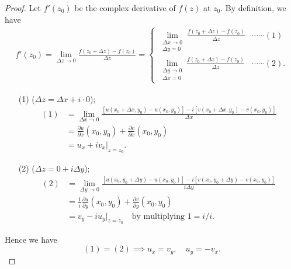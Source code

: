 \documentclass[12pt,openany]{book}
\theoremstyle{definition}
\newcommand{\of}[1]{\left( #1 \right)}
\begin{document}
	\begin{proof}
		Let $f'(z_0)$ be the complex derivative of $f(z)$ at $z_0$. By definition, we have \begin{align*}
		f'(z_0)=\lim_{\Delta z\to 0}\frac{f\of{z_0+\Delta z}-f\of{z_0}}{\Delta z}=\begin{cases}
		\displaystyle\lim\limits_{\substack{\Delta x\to 0\\ \Delta y=0}}\frac{f\of{z_0+\Delta z}-f\of{z_0}}{\Delta z} &\cdots\cdots(1)\\
		\displaystyle\lim\limits_{\substack{\Delta y\to 0\\ \Delta x=0}}\frac{f\of{z_0+\Delta z}-f\of{z_0}}{\Delta z}&\cdots\cdots(2).
		\end{cases}
		\end{align*}
		
		\begin{itemize}
			\item[(1)] ($\Delta z=\Delta x+i\cdot 0$);
			\begin{align*}
			(1)&=\lim\limits_{\Delta x\to 0}\frac{\left[u(x_0+\Delta x, y_0)-u\of{x_0,y_0}\right]-i\left[v(x_0+\Delta x,y_0)-v\of{x_0,y_0}\right]}{\Delta x}\\
			&=\frac{\partial u}{\partial x}\of{x_0,y_0}+\frac{\partial v}{\partial x}\of{x_0,y_0}\\
			&= u_x+iv_x\bigg|_{z=z_0}.
			\end{align*}
			\item[(2)] ($\Delta z=0+i\Delta y$);
			\begin{align*}
			(2)&=\lim\limits_{\Delta y\to 0}\frac{\left[u(x_0, y_0+\Delta y)-u\of{x_0,y_0}\right]-i\left[v(x_0,y_0+\Delta y)-v\of{x_0,y_0}\right]}{i\Delta y}\\
			&=\frac{1}{i}\frac{\partial u}{\partial y}\of{x_0,y_0}+\frac{\partial v}{\partial y}\of{x_0,y_0}\\
			&= v_y-iu_y\bigg|_{z=z_0}\quad\text{by multiplying $1=i/i$}.
			\end{align*}
		\end{itemize} Hence we have \[
		(1)=(2)\implies u_x=v_y,\quad u_y=-v_x.
		\]
	\end{proof}
	
\end{document}
